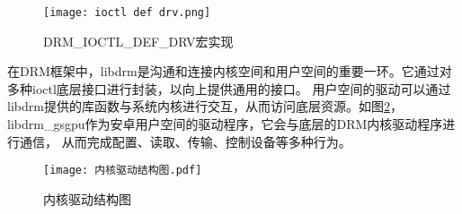 \begin{figure}[h]
  \centering
  \texttt{[image: ioctl def drv.png]}
  \caption{DRM\_IOCTL\_DEF\_DRV宏实现}
  \label{fig:ioctl def drv}
\end{figure}




在DRM框架中，libdrm是沟通和连接内核空间和用户空间的重要一环。它通过对多种ioctl底层接口进行封装，以向上提供通用的接口。
用户空间的驱动可以通过libdrm提供的库函数与系统内核进行交互，从而访问底层资源。如图\ref{fig:内核驱动结构图}，
libdrm\_gsgpu作为安卓用户空间的驱动程序，它会与底层的DRM内核驱动程序进行通信，
从而完成配置、读取、传输、控制设备等多种行为。

\begin{figure}[h]
  \centering
  \texttt{[image: 内核驱动结构图.pdf]}
  \caption{内核驱动结构图}
  \label{fig:内核驱动结构图}
\end{figure}

